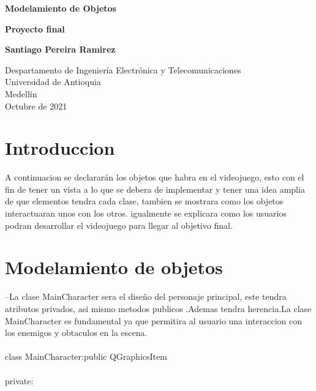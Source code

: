 \documentclass{article}
\begin{document}
\begin{titlepage}
    \begin{center}
        \vspace*{1cm}
            
        \Huge
        \textbf{Modelamiento de Objetos}
            
        \vspace{0.5cm}
        \LARGE
        
        \textbf{Proyecto final}
            
        \vspace{1.5cm}
            
        \textbf{Santiago Pereira Ramirez}
            
        \vfill
            
        \vspace{0.8cm}
            
        \Large
        Despartamento de Ingeniería Electrónica y Telecomunicaciones\\
        Universidad de Antioquia\\
        Medellín\\
        Octubre de 2021
            
    \end{center}
\end{titlepage}

\tableofcontents
\newpage

\section{Introduccion}\label{intro}
A continuacion se declararán los objetos que habra en el videojuego, esto con el fin de tener un vista a lo que se debera de implementar y tener una idea amplia de que elementos tendra cada clase, tambien se mostrara como los objetos interactuaran unos con los otros. igualmente se explicara como los usuarios podran desarrollar el videojuego para llegar al objetivo final.


\section{Modelamiento de objetos}\label{intro}

--La clase MainCharacter sera el diseño del personaje principal, este tendra atributos privados, asi mismo metodos publicos .Ademas tendra herencia.La clase MainCharacter es fundamental ya que permitira al usuario una interaccion con los enemigos y obtaculos en la escena.\\
\\
class MainCharacter:public QGraphicsItem\\
\lbrace\\
private:\\
\end{document}
